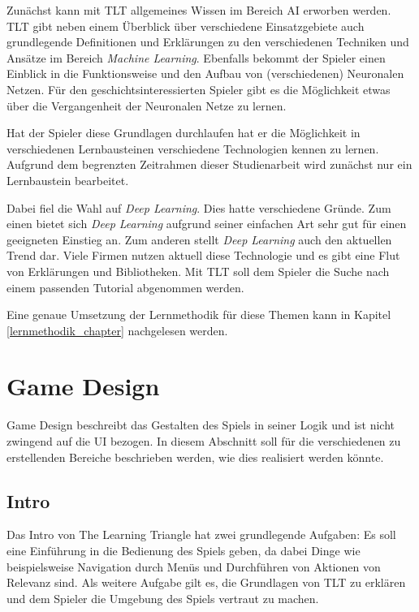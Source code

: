 Zunächst kann mit TLT allgemeines Wissen im Bereich AI erworben werden. TLT gibt neben einem Überblick über verschiedene Einsatzgebiete auch grundlegende Definitionen und Erklärungen zu den verschiedenen Techniken und Ansätze im Bereich \textit{Machine Learning}. Ebenfalls bekommt der Spieler einen Einblick in die Funktionsweise und den Aufbau von (verschiedenen) Neuronalen Netzen. Für den geschichtsinteressierten Spieler gibt es die Möglichkeit etwas über die Vergangenheit der Neuronalen Netze zu lernen.

Hat der Spieler diese Grundlagen durchlaufen hat er die Möglichkeit in verschiedenen Lernbausteinen verschiedene Technologien kennen zu lernen. Aufgrund dem begrenzten Zeitrahmen dieser Studienarbeit wird zunächst nur ein Lernbaustein bearbeitet.

Dabei fiel die Wahl auf \textit{Deep Learning}. Dies hatte verschiedene Gründe. Zum einen bietet sich \textit{Deep Learning} aufgrund seiner \glqq einfachen\grqq{} Art sehr gut für einen geeigneten Einstieg an. Zum anderen stellt \textit{Deep Learning} auch den aktuellen Trend dar. Viele Firmen nutzen aktuell diese Technologie und es gibt eine Flut von Erklärungen und Bibliotheken. Mit TLT soll dem Spieler die Suche nach einem passenden Tutorial abgenommen werden.

Eine genaue Umsetzung der Lernmethodik für diese Themen kann in Kapitel \ref{lernmethodik_chapter} nachgelesen werden.


\section{Game Design}
\label{strukturlobby}

Game Design beschreibt das Gestalten des Spiels in seiner Logik und ist nicht zwingend auf die UI bezogen. In diesem Abschnitt soll für die verschiedenen zu erstellenden Bereiche beschrieben werden, wie dies realisiert werden könnte.

\subsection{Intro}
\label{lm_intro}

Das Intro von The Learning Triangle hat zwei grundlegende Aufgaben: Es soll eine Einführung in die Bedienung des Spiels geben, da dabei Dinge wie beispielsweise Navigation durch Menüs und Durchführen von Aktionen von Relevanz sind. Als weitere Aufgabe gilt es, die Grundlagen von TLT zu erklären und dem Spieler die Umgebung des Spiels vertraut zu machen.

